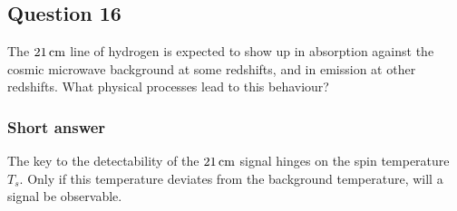 \documentclass[a4paper,11pt]{article}
\begin{document}
%
%

\newpage
\subsection{Question 16}

The $21\,{\rm cm}$ line of hydrogen is expected to show up in absorption against the cosmic microwave background at some redshifts, and in emission at other redshifts. What physical processes lead to this behaviour?

\subsubsection{Short answer}

The key to the detectability of the $21\,{\rm cm}$ signal hinges on the spin temperature $T_s$. Only if this temperature deviates from the background temperature, will a signal be observable.
\end{document}
